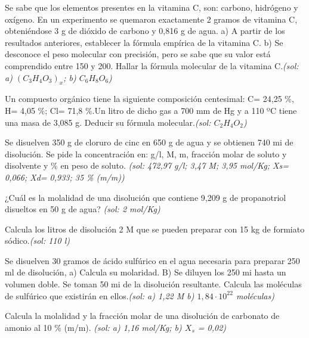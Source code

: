 \begin{multicols}{2}
\begin{problem}
\end{problem}
\begin{problem}
Se sabe que los elementos presentes en la vitamina C, son: carbono, hidrógeno y oxígeno. En un experimento se quemaron exactamente 2 gramos de vitamina C, obteniéndose 3 g de dióxido de carbono y 0,816 g de agua.
a)	A partir de los resultados anteriores, establecer la fórmula empírica de la vitamina C.
b)	Se desconoce el peso molecular con precisión, pero se sabe que su valor está comprendido entre 150 y 200. Hallar la fórmula molecular de la vitamina C.\textit{\scriptsize(sol: a) $(C_3H_4O_3)_x$; b) $C_6H_8O_6$)}
\end{problem}
\begin{problem}
Un compuesto orgánico tiene la siguiente composición centesimal: C= 24,25 \%, H= 4,05 \%; Cl= 71,8 \%.Un litro de dicho gas a 700 mm de Hg y a 110 ºC tiene una masa de 3,085 g. Deducir su fórmula molecular.\textit{\scriptsize(sol: $C_2H_4O_2$)}
\end{problem}
\begin{problem}
Se disuelven 350 g de cloruro de cinc en 650 g de agua y se obtienen 740 mi de disolución. Se pide la concentración en: g/l, M, m, fracción molar de soluto y disolvente y \% en peso de soluto. \textit{\scriptsize(sol: 472,97 g/l; 3,47 M; 3,95 mol/Kg; Xs= 0,066; Xd= 0,933; 35 \% (m/m))}
\end{problem}
\begin{problem}
¿Cuál es la molalidad de una disolución que contiene 9,209 g de propanotriol disueltos en 50 g de agua? \textit{\scriptsize(sol: 2 mol/Kg)}
\end{problem}
\begin{problem}
Calcula los litros de disolución 2 M que se pueden preparar con 15 kg de formiato sódico.\textit{\scriptsize(sol: 110 l)}
\end{problem}
\begin{problem}
Se disuelven 30 gramos de ácido sulfúrico en el agua necesaria para preparar 250 ml de disolución, a) Calcula su molaridad. B) Se diluyen los 250 mi hasta un volumen doble. Se toman 50 mi de la disolución resultante. Calcula las moléculas de sulfúrico que existirán en ellos.\textit{\scriptsize(sol: a) 1,22 M b) $1,84\cdot 10^{22}$ moléculas)}	
\end{problem}
\begin{problem}
Calcula la molalidad y la fracción molar de una disolución de carbonato de amonio al 10 \% (m/m). \textit{\scriptsize(sol: a) 1,16 mol/Kg; b) $X_s$ = 0,02)}
\end{problem}

\end{multicols}
